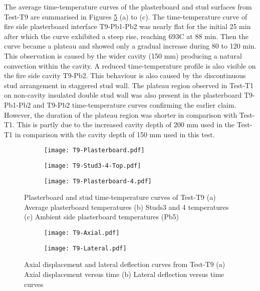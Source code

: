 The average time-temperature curves of the plasterboard and stud surfaces from Test-T9 are summarised in Figures \ref{fig:T9-time-temperature-b} (a) to (c). The time-temperature curve of fire side plasterboard interface T9-Pb1-Pb2 was nearly flat for the initial 25 min after which the curve exhibited a steep rise, reaching 693\degree C at 88 min. Then the curve became a plateau and showed only a gradual increase during 80 to 120 min. This observation is caused by the wider cavity (150 mm) producing a natural convection within the cavity. A reduced time-temperature profile is also visible on the fire side cavity T9-Pb2. This behaviour is also caused by the discontinuous stud arrangement in staggered stud wall. The plateau region observed in Test-T1 on non-cavity insulated double stud wall was also present in the plasterboard T9-Pb1-Pb2 and T9-Pb2 time-temperature curves confirming the earlier claim. However, the duration of the plateau region was shorter in comparison with Test-T1. This is partly due to the increased cavity depth of 200 mm used in the Test-T1 in comparison with the cavity depth of 150 mm used in this test.  
\begin{figure}[!htbp]
	\centering
	\begin{subfigure}[b]{0.7\textwidth}
		\centering
		\texttt{[image: T9-Plasterboard.pdf]}
		\caption{}
		\label{subfig:T9-Plasterboard}
	\end{subfigure}
	\begin{subfigure}[b]{0.7\textwidth}
		\centering
		\texttt{[image: T9-Stud3-4-Top.pdf]}
		\caption{}
		\label{subfig:T9-Studs-3-4-Top}
	\end{subfigure}
	\label{fig:T9-time-temperature-a}
\end{figure}
\begin{figure}[!htbp]
	\ContinuedFloat
	\centering
	\begin{subfigure}[b]{0.7\textwidth}
		\centering
		\texttt{[image: T9-Plasterboard-4.pdf]}
		\caption{}
		\label{subfig:T9-Plasterboard-5}
	\end{subfigure}
	\caption{Plasterboard and stud time-temperature curves of Test-T9 (a) Average plasterboard temperatures (b) Studs3 and 4 temperatures (c) Ambient side plasterboard temperatures (Pb5) }
	\label{fig:T9-time-temperature-b}
\end{figure}
\begin{figure}[!htbp]
	\centering
	\begin{subfigure}[b]{0.7\textwidth}
		\centering
		\texttt{[image: T9-Axial.pdf]}
		\caption{}
		\label{subfig:T9-Axial}
	\end{subfigure}
	\begin{subfigure}[b]{0.7\textwidth}
		\centering
		\texttt{[image: T9-Lateral.pdf]}
		\caption{}
		\label{subfig:T9-Lateral}
	\end{subfigure}
	\caption{Axial displacement and lateral deflection curves from Test-T9 (a) Axial displacement versus time (b) Lateral deflection versus time curves}
	\label{fig:T9-displacement}
\end{figure}

